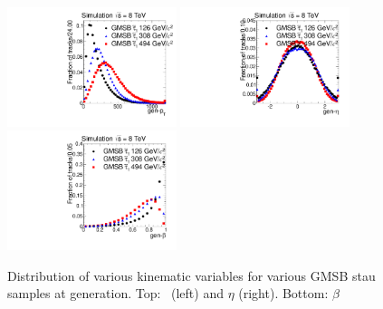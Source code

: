 \begin{figure}
 \begin{center}
  \includegraphics[clip=true, trim=0.0cm 0cm 1.4cm 0cm, width=0.44\textwidth]{figures/muonly/Selection_Comp_GMStau_genpT}
  \includegraphics[clip=true, trim=0.0cm 0cm 1.4cm 0cm, width=0.44\textwidth]{figures/muonly/Selection_Comp_GMStau_geneta}
  \includegraphics[clip=true, trim=0.0cm 0cm 1.4cm 0cm, width=0.44\textwidth]{figures/muonly/Selection_Comp_GMStau_genbeta}
 \end{center}
 \caption[Distribution of \pt, $\eta$, and $\beta$ for various GMSB stau samples at generation]
{Distribution of various kinematic variables for various GMSB stau samples at generation.
Top: \pt\ (left) and $\eta$ (right).
Bottom: $\beta$
   \label{fig:GenGMStau}}
\end{figure}

